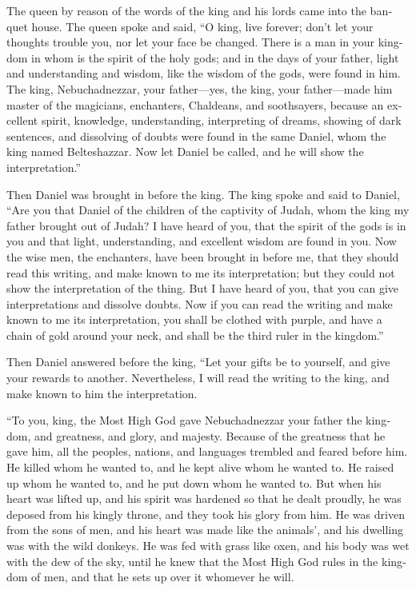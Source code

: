 \begin{paracol}{2}
\begin{otherlanguage}{english}
 The queen by reason of the words of the king and his
lords came into the banquet house. The queen spoke and said, ``O king,
live forever; don't let your thoughts trouble you, nor let your face be
changed.  There is a man in your kingdom in whom is the
spirit of the holy gods; and in the days of your father, light and
understanding and wisdom, like the wisdom of the gods, were found in
him. The king, Nebuchadnezzar, your father---yes, the king, your
father---made him master of the magicians, enchanters, Chaldeans, and
soothsayers,  because an excellent spirit, knowledge,
understanding, interpreting of dreams, showing of dark sentences, and
dissolving of doubts were found in the same Daniel, whom the king named
Belteshazzar. Now let Daniel be called, and he will show the
interpretation.''

 Then Daniel was brought in before the king. The king
spoke and said to Daniel, ``Are you that Daniel of the children of the
captivity of Judah, whom the king my father brought out of Judah?
 I have heard of you, that the spirit of the gods is in
you and that light, understanding, and excellent wisdom are found in
you.  Now the wise men, the enchanters, have been brought
in before me, that they should read this writing, and make known to me
its interpretation; but they could not show the interpretation of the
thing.  But I have heard of you, that you can give
interpretations and dissolve doubts. Now if you can read the writing and
make known to me its interpretation, you shall be clothed with purple,
and have a chain of gold around your neck, and shall be the third ruler
in the kingdom.''

 Then Daniel answered before the king, ``Let your gifts
be to yourself, and give your rewards to another. Nevertheless, I will
read the writing to the king, and make known to him the interpretation.

 ``To you, king, the Most High God gave Nebuchadnezzar
your father the kingdom, and greatness, and glory, and majesty.
 Because of the greatness that he gave him, all the
peoples, nations, and languages trembled and feared before him. He
killed whom he wanted to, and he kept alive whom he wanted to. He raised
up whom he wanted to, and he put down whom he wanted to. 
But when his heart was lifted up, and his spirit was hardened so that he
dealt proudly, he was deposed from his kingly throne, and they took his
glory from him.  He was driven from the sons of men, and
his heart was made like the animals', and his dwelling was with the wild
donkeys. He was fed with grass like oxen, and his body was wet with the
dew of the sky, until he knew that the Most High God rules in the
kingdom of men, and that he sets up over it whomever he will.


\end{otherlanguage}
\end{paracol}
